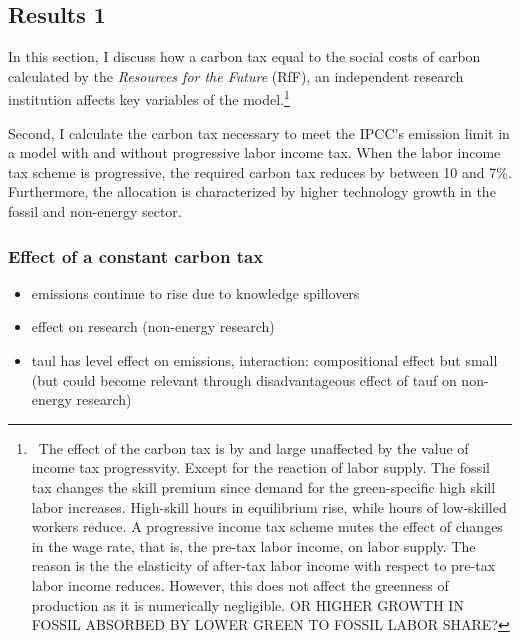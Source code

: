 \subsection{Results 1}\label{subsec:exp}
In this section, I discuss how a carbon tax  equal to the social costs of carbon calculated by the \textit{Resources for the Future} (RfF), an independent research institution affects key variables of the model.\footnote{\ The effect of the carbon tax is by and large unaffected by the value of income tax progressvity. Except for the reaction of labor supply. The fossil tax changes the skill premium since demand for the green-specific high skill labor increases. High-skill hours in equilibrium rise, while hours of low-skilled workers reduce.  A progressive income tax scheme mutes the effect of changes in the wage rate, that is, the pre-tax labor income, on labor supply. The reason is the the elasticity of after-tax labor income with respect to pre-tax labor income reduces. However, this does not affect the greenness of production as it is numerically negligible. OR HIGHER GROWTH IN FOSSIL ABSORBED BY LOWER GREEN TO FOSSIL LABOR SHARE?}

Second, I calculate the carbon tax necessary to meet the IPCC's emission limit in a model with and without progressive labor income tax. When the labor income tax scheme is progressive, the required carbon tax reduces by between 10 and 7\%. Furthermore, the allocation is characterized by higher technology growth in the fossil and non-energy sector. 


\subsubsection{Effect of a constant carbon tax}
 \begin{itemize}
 	\item  emissions continue to rise due to knowledge spillovers \checkmark
 	\item  effect on research (non-energy research) \checkmark
 	\item taul has level effect on emissions, interaction: compositional effect but small (but could become relevant through disadvantageous effect of tauf on non-energy research) \checkmark 	
 \end{itemize}

